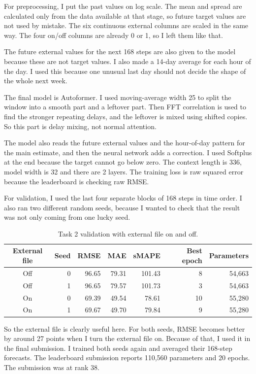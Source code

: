 \documentclass[11pt]{article}
\begin{document}
For preprocessing, I put the past values on log scale. The mean and spread are calculated only from the data available at that stage, so future target values are not used by mistake. The six continuous external columns are scaled in the same way. The four on/off columns are already 0 or 1, so I left them like that.

The future external values for the next 168 steps are also given to the model because these are not target values. I also made a 14-day average for each hour of the day. I used this because one unusual last day should not decide the shape of the whole next week.

The final model is Autoformer. I used moving-average width 25 to split the window into a smooth part and a leftover part. Then FFT correlation is used to find the stronger repeating delays, and the leftover is mixed using shifted copies. So this part is delay mixing, not normal attention.

The model also reads the future external values and the hour-of-day pattern for the main estimate, and then the neural network adds a correction. I used Softplus at the end because the target cannot go below zero. The context length is 336, model width is 32 and there are 2 layers. The training loss is raw squared error because the leaderboard is checking raw RMSE.

For validation, I used the last four separate blocks of 168 steps in time order. I also ran two different random seeds, because I wanted to check that the result was not only coming from one lucky seed.

\begin{table}[H]
\centering
\begin{tabular}{crrrrrr}
\toprule
\textbf{External file} & \textbf{Seed} & \textbf{RMSE} & \textbf{MAE} & \textbf{sMAPE} & \textbf{Best epoch} & \textbf{Parameters} \\
\midrule
Off & 0 & 96.65 & 79.31 & 101.43 & 8 & 54,663 \\
Off & 1 & 96.65 & 79.57 & 101.73 & 3 & 54,663 \\
On & 0 & 69.39 & 49.54 & 78.61 & 10 & 55,280 \\
On & 1 & 69.67 & 49.70 & 79.84 & 9 & 55,280 \\
\bottomrule
\end{tabular}
\caption{Task 2 validation with external file on and off.}
\end{table}

So the external file is clearly useful here. For both seeds, RMSE becomes better by around 27 points when I turn the external file on. Because of that, I used it in the final submission. I trained both seeds again and averaged their 168-step forecasts. The leaderboard submission reports 110,560 parameters and 20 epochs. The submission was at rank 38.
\end{document}
